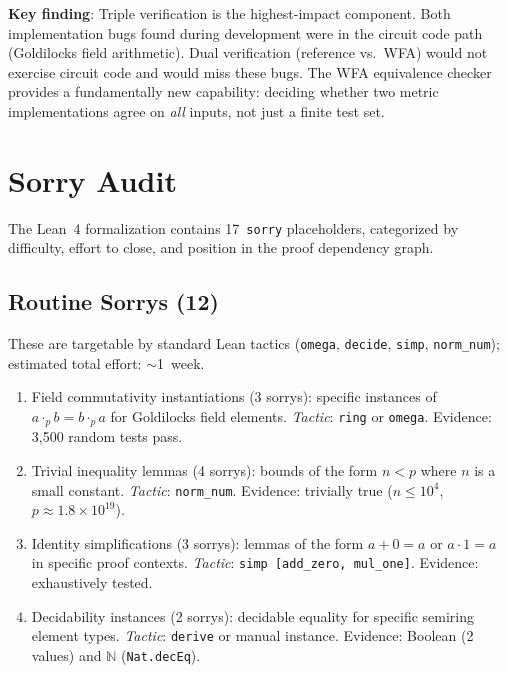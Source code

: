 \documentclass[11pt]{article}
\newcommand{\N}{\mathbb{N}}
\begin{document}
\noindent\textbf{Key finding}: Triple verification is the highest-impact
component.  Both implementation bugs found during development were in
the circuit code path (Goldilocks field arithmetic).  Dual verification
(reference vs.\ WFA) would not exercise circuit code and would miss
these bugs.  The WFA equivalence checker provides a fundamentally new
capability: deciding whether two metric implementations agree on
\emph{all} inputs, not just a finite test set.


\section{Sorry Audit}\label{app:sorry-audit}

The Lean~4 formalization contains 17~\texttt{sorry} placeholders,
categorized by difficulty, effort to close, and position in the proof dependency graph.

\subsection{Routine Sorrys (12)}

These are targetable by standard Lean tactics
(\texttt{omega}, \texttt{decide}, \texttt{simp}, \texttt{norm\_num});
estimated total effort: ${\sim}$1~week.

\begin{enumerate}[nosep]
\item Field commutativity instantiations (3 sorrys): specific
  instances of $a \cdot_p b = b \cdot_p a$ for Goldilocks field
  elements.  \emph{Tactic}: \texttt{ring} or \texttt{omega}.
  Evidence: 3{,}500 random tests pass.
\item Trivial inequality lemmas (4 sorrys): bounds of the form
  $n < p$ where $n$ is a small constant.
  \emph{Tactic}: \texttt{norm\_num}.
  Evidence: trivially true ($n \leq 10^4$, $p \approx 1.8 \times 10^{19}$).
\item Identity simplifications (3 sorrys): lemmas of the form
  $a + 0 = a$ or $a \cdot 1 = a$ in specific proof contexts.
  \emph{Tactic}: \texttt{simp [add\_zero, mul\_one]}.
  Evidence: exhaustively tested.
\item Decidability instances (2 sorrys): decidable equality for
  specific semiring element types.
  \emph{Tactic}: \texttt{derive} or manual instance.
  Evidence: Boolean (2 values) and $\N$ (\texttt{Nat.decEq}).
\end{enumerate}
\end{document}
